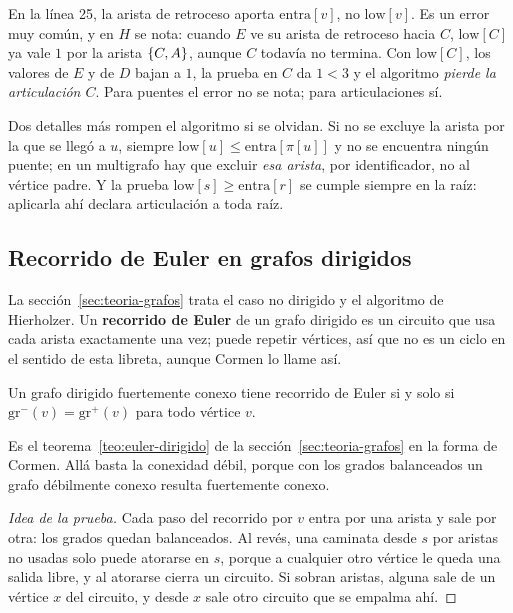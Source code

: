 \documentclass[11pt,letterpaper]{article}
\begin{document}
\begin{ojo}
  En la línea 25, la arista de retroceso aporta $\text{entra}[v]$, no
  $\text{low}[v]$. Es un error muy común, y en $H$ se nota: cuando $E$
  ve su arista de retroceso hacia $C$, $\text{low}[C]$ ya vale $1$ por
  la arista $\left\{ C, A \right\}$, aunque $C$ todavía no termina. Con
  $\text{low}[C]$, los valores de $E$ y de $D$ bajan a $1$, la prueba
  en $C$ da $1 < 3$ y el algoritmo \emph{pierde la articulación $C$}.
  Para puentes el error no se nota; para articulaciones sí.
\end{ojo}

\begin{ojo}
  Dos detalles más rompen el algoritmo si se olvidan. Si no se excluye
  la arista por la que se llegó a $u$, siempre
  $\text{low}[u] \le \text{entra}[\pi[u]]$ y no se encuentra ningún
  puente; en un multigrafo hay que excluir \emph{esa arista}, por
  identificador, no al vértice padre. Y la prueba
  $\text{low}[s] \ge \text{entra}[r]$ se cumple siempre en la raíz:
  aplicarla ahí declara articulación a toda raíz.
\end{ojo}


\subsection*{Recorrido de Euler en grafos dirigidos}

La sección~\ref{sec:teoria-grafos} trata el caso no dirigido y el
algoritmo de Hierholzer. Un \textbf{recorrido de Euler} de un grafo
dirigido es un circuito que usa cada arista exactamente una vez; puede
repetir vértices, así que no es un ciclo en el sentido de esta
libreta, aunque Cormen lo llame así.

\begin{teorema}
  \label{teo:euler-dirigido-cormen}
  Un grafo dirigido fuertemente conexo tiene recorrido de Euler si y
  solo si $\text{gr}^{-}(v) = \text{gr}^{+}(v)$ para todo vértice $v$.
\end{teorema}

Es el teorema~\ref{teo:euler-dirigido} de la
sección~\ref{sec:teoria-grafos} en la forma de Cormen. Allá basta la
conexidad débil, porque con los grados balanceados un grafo débilmente
conexo resulta fuertemente conexo.

\begin{proof}[Idea de la prueba]
  Cada paso del recorrido por $v$ entra por una arista y sale por otra:
  los grados quedan balanceados. Al revés, una caminata desde $s$ por
  aristas no usadas solo puede atorarse en $s$, porque a cualquier otro
  vértice le queda una salida libre, y al atorarse cierra un circuito.
  Si sobran aristas, alguna sale de un vértice $x$ del circuito, y
  desde $x$ sale otro circuito que se empalma ahí.
\end{proof}
\end{document}

